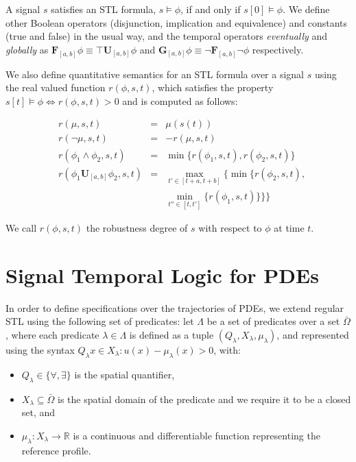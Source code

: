 \documentclass[letterpaper, 10 pt, conference]{ieeeconf/ieeeconf}
\newcommand*{\R}{\mathbb{R}}
\newcommand{\Always}{\mathbf{G}}
\newcommand{\Event}{\mathbf{F}}
\newcommand{\luntil}{\mathbf{U}}
\begin{document}
A signal $s$ satisfies an STL formula, $s \models \phi$, if and
only if $s[0] \models \phi$. We define other Boolean operators (disjunction,
implication and equivalence) and constants (true and false) in the usual way, 
and the temporal operators
\emph{eventually} and \emph{globally} as $\Event_{[a, b]} \phi \equiv \top
\luntil_{[a,b]} \phi$ and $\Always_{[a, b]} \phi \equiv \lnot \Event_{[a,b]}
\lnot \phi$ respectively.

We also define quantitative semantics for an STL formula over a signal $s$
using the real valued function $r(\phi, s, t)$, which satisfies the property $s[t]
\models \phi \iff r(\phi,s, t) > 0$ and is computed as follows:

\begin{equation}
    \begin{aligned}
        &r(\mu, s, t) &= &\mu(s(t)) \\
        &r(\lnot \mu, s, t) &= &-r(\mu, s,t) \\
        &r(\phi_1 \land \phi_2, s, t) &= &\min\{r(\phi_1,s, t),
    r(\phi_2,s, t)\} \\
    &r(\phi_1 \luntil_{[a,b]} \phi_2,s, t) &= 
    &\max_{t' \in [t+a, t+b]} \biggl\{ \min \bigl\{ r(\phi_2,s, t), \\
    & & &\min_{t'' \in [t, t']}\{r(\phi_1,s, t)\} \bigr\} \biggr\}
    \end{aligned}
\end{equation}

We call $r(\phi,s, t)$ the robustness degree of $s$ with respect to $\phi$ at
time $t$.

\section{Signal Temporal Logic for PDEs}
\label{sec:signal_temporal_logic_for_pdes}

In order to define specifications over the trajectories of PDEs, we extend
regular STL using the following set of predicates:
let $\Lambda$ be a set of predicates over
a set $\bar\Omega$, where each predicate $\lambda \in \Lambda$ is defined as a
tuple $(Q_\lambda, X_\lambda, \mu_\lambda)$, 
and represented using the syntax $Q_\lambda x \in X_\lambda : u(x) - \mu_\lambda(x) >
0$, with:

\begin{itemize}
    \item $Q_\lambda \in \{\forall, \exists\}$ is the spatial quantifier,
    \item $X_\lambda \subseteq \bar\Omega$ is the spatial domain of the predicate and
        we require it to be a closed set, and 
    \item $\mu_\lambda : X_\lambda \to \R$ is a continuous and differentiable function 
        representing the reference profile.
\end{itemize}
\end{document}
